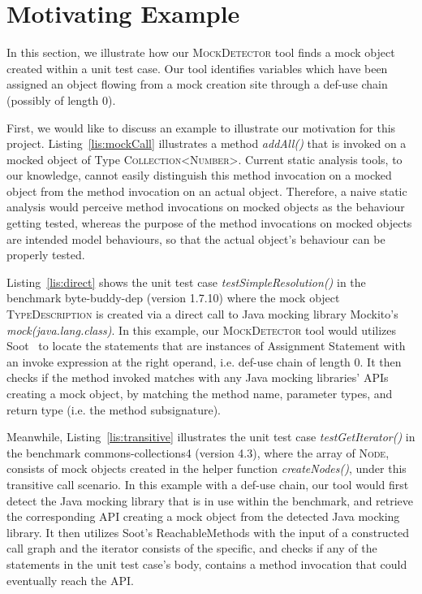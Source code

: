 \section{Motivating Example}
\label{sec:motivating-example}

In this section, we illustrate how our \textsc{MockDetector} tool finds a mock object created within a unit test case. Our tool identifies variables which have been assigned an object flowing from a mock creation site through a def-use chain (possibly of length 0).

First, we would like to discuss an example to illustrate our motivation for this project. Listing~\ref{lis:mockCall} illustrates a method \textit{addAll()} that is invoked on a mocked object of Type \textsc{Collection<Number>}. Current static analysis tools, to our knowledge, cannot easily distinguish this method invocation on a mocked object from the method invocation on an actual object. Therefore, a naive static analysis would perceive method invocations on mocked objects as the behaviour getting tested, whereas the purpose of the method invocations on mocked objects are intended model behaviours, so that the actual object's behaviour can be properly tested.

Listing~\ref{lis:direct} shows the unit test case \textit{testSimpleResolution()} in the benchmark byte-buddy-dep (version 1.7.10) where the mock object \textsc{TypeDescription} is created via a direct call to Java mocking library Mockito's \textit{mock(java.lang.class)}. In this example, our \textsc{MockDetector} tool would utilizes Soot~\cite{Vallee-Rai:1999:SJB:781995.782008} to locate the statements that are instances of Assignment Statement with an invoke expression at the right operand, i.e. def-use chain of length 0. It then checks if the method invoked matches with any Java mocking libraries' APIs creating a mock object, by matching the method name, parameter types, and return type (i.e. the method subsignature).

Meanwhile, Listing~\ref{lis:transitive} illustrates the unit test case \textit{testGetIterator()} in the benchmark commons-collections4 (version 4.3), where the array of \textsc{Node}, consists of mock objects created in the helper function \textit{createNodes()}, under this transitive call scenario. In this example with a def-use chain, our tool would first detect the Java mocking library that is in use within the benchmark, and retrieve the corresponding API creating a mock object from the detected Java mocking library. It then utilizes Soot's ReachableMethods with the input of a constructed call graph and the iterator consists of the specific, and checks if any of the statements in the unit test case's body, contains a method invocation that could eventually reach the API. 

